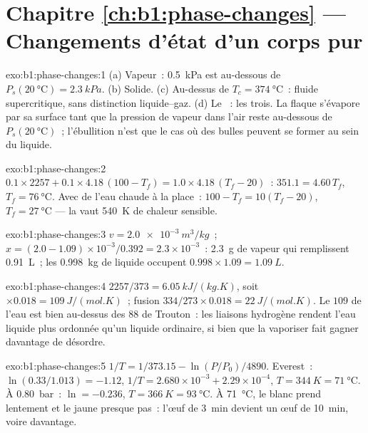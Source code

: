 \section*{Chapitre \ref{ch:b1:phase-changes} --- Changements d'état d'un corps pur}

\begin{solution}{exo:b1:phase-changes:1}
(a) Vapeur~: \qty{0.5}{kPa} est au-dessous de $P_s(\qty{20}{\degreeCelsius}) = \qty{2.3}{kPa}$.
(b) Solide. (c) Au-dessus de $T_c = \qty{374}{\degreeCelsius}$~: fluide
supercritique, sans distinction liquide--gaz. (d) Le ~: les trois.
La flaque s'évapore par sa surface tant que la pression de vapeur dans l'air
reste au-dessous de $P_s(\qty{20}{\degreeCelsius})$~; l'ébullition n'est que le
cas où des bulles peuvent se former au sein du liquide.
\end{solution}

\begin{solution}{exo:b1:phase-changes:2}
$0.1 \times 2257 + 0.1 \times 4.18\,(100 - T_f) = 1.0 \times 4.18\,(T_f - 20)$~:
$351.1 = 4.60\,T_f$, $T_f = \qty{76}{\degreeCelsius}$. Avec de l'eau chaude à
la place~: $100 - T_f = 10(T_f - 20)$, $T_f = \qty{27}{\degreeCelsius}$ --- la
 vaut \qty{540}{K} de chaleur sensible.
\end{solution}

\begin{solution}{exo:b1:phase-changes:3}
$v = \qty{2.0e-3}{m^3/kg}$~; $x = (2.0 - 1.09) \times 10^{-3}/0.392 = 2.3 \times 10^{-3}$~:
\qty{2.3}{g} de vapeur qui remplissent \qty{0.91}{L}~; les \qty{0.998}{kg} de
liquide occupent $0.998 \times 1.09 = \qty{1.09}{L}$.
\end{solution}

\begin{solution}{exo:b1:phase-changes:4}
$2257/373 = \qty{6.05}{kJ/(kg.K)}$, soit $\times 0.018 = \qty{109}{J/(mol.K)}$~;
fusion $334/273 \times 0.018 = \qty{22}{J/(mol.K)}$. Le $109$ de l'eau est bien
au-dessus des $88$ de Trouton~: les liaisons hydrogène rendent l'eau liquide
plus ordonnée qu'un liquide ordinaire, si bien que la vaporiser fait gagner davantage de désordre.
\end{solution}

\begin{solution}{exo:b1:phase-changes:5}
$1/T = 1/373.15 - \ln(P/P_0)/4890$. Everest~: $\ln(0.33/1.013) = -1.12$,
$1/T = 2.680 \times 10^{-3} + 2.29 \times 10^{-4}$, $T = \qty{344}{K} =
\qty{71}{\degreeCelsius}$. À \qty{0.80}{bar}~: $\ln = -0.236$, $T = \qty{366}{K} =
\qty{93}{\degreeCelsius}$. À \qty{71}{\degreeCelsius}, le blanc prend lentement
et le jaune presque pas~: l'œuf de \qty{3}{min} devient un œuf de
\qty{10}{min}, voire davantage.
\end{solution}

